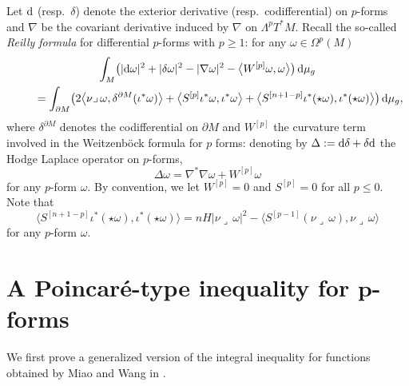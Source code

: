 Let ${\rm d}$ (resp.\ $\delta$) denote the exterior derivative (resp.\ codifferential) on $p$-forms and $\nabla$ be the covariant derivative induced by $\nabla$ on $\Lambda^pT^*M$.
Recall the so-called \emph{Reilly formula} \cite[Theorem~3]{RaulotSavo11} for differential $p$-forms with $p\geq 1$: for any $\omega\in\Omega^p(M)$
\begin{gather}
\int_M\bigl(|{\rm d}\omega|^2+|\delta\omega|^2-|\nabla\omega|^2-\bigl\langle W^{[p]}\omega,\omega\bigr\rangle\bigr)\,{\rm d}\mu_g \nonumber\\
\qquad{} =\int_{\partial M}\bigl(2\bigl\langle\nu\lrcorner\,\omega,\delta^{\partial M}(\iota^*\omega)\bigr\rangle+\bigl\langle S^{[p]}\iota^*\omega,\iota^*\omega\bigr\rangle+\bigl\langle S^{[n+1-p]}\iota^*(\star\omega),\iota^*(\star\omega)\bigr\rangle\bigr)\,{\rm d}\mu_g,\label{eq:Reillyformula}
\end{gather}
where $\delta^{\partial M}$ denotes the codifferential on $\partial M$ and $W^{[p]}$ the curvature term involved in the Weitzenb\"ock formula for $p$ forms: denoting by $\Delta:={\rm d}\delta+\delta {\rm d}$ the Hodge Laplace operator on $p$-forms,
\[\Delta\omega=\nabla^*\nabla\omega+W^{[p]}\omega\]
for any $p$-form $\omega$.  By convention, we let $W^{[p]}=0$ and $S^{[p]}=0$ for all $p\leq 0$.
Note that \cite[Theorem 3]{RaulotSavo11}
\begin{equation*}%
\bigl\langle S^{[n+1-p]}\iota^*(\star\omega),\iota^*(\star\omega)\bigr\rangle=nH|\nu\lrcorner\,\omega|^2-\bigl\langle S^{[p-1]}(\nu\lrcorner\,\omega),\nu\lrcorner\,\omega\bigr\rangle
\end{equation*}
for any $p$-form $\omega$.

\section[A Poincar\'e-type inequality for p-forms]{A Poincar\'e-type inequality for $\boldsymbol p$-forms}\label{s:Poincareineqpformsgeneral}

We first prove a generalized version of the integral i\-ne\-qua\-li\-ty for functions obtained by Miao and Wang in \cite[equation~(1.3)]{MiaoWang14}.


